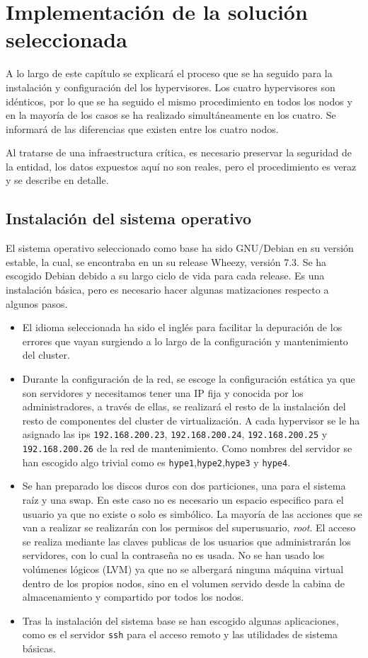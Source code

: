 \documentclass[12pt,a4paper,titlepage,twoside]{report}
\begin{document}
\chapter{Implementación de la solución seleccionada}

\par A lo largo de este capítulo se explicará el proceso que se ha seguido para la instalación y configuración del los hypervisores. Los cuatro hypervisores son idénticos, por lo que se ha seguido el mismo procedimiento en todos los nodos y en la mayoría de los casos se ha realizado simultáneamente en los cuatro. Se informará de las diferencias que existen entre los cuatro nodos.
\par Al tratarse de una infraestructura crítica, es necesario preservar la seguridad de la entidad, los datos expuestos aquí no son reales, pero el procedimiento es veraz y se describe en detalle.
\section{Instalación del sistema operativo}
El sistema operativo seleccionado como base ha sido GNU/Debian en su versión estable, la cual, se encontraba en un su release Wheezy, versión 7.3. Se ha escogido Debian debido a su largo ciclo de vida para cada release. Es una instalación básica, pero es necesario hacer algunas matizaciones respecto a algunos pasos.
\begin{itemize}
	\item El idioma seleccionada ha sido el inglés para facilitar la depuración de los errores que vayan surgiendo a lo largo de la configuración y mantenimiento del cluster.
	\item Durante la configuración de la red, se escoge la configuración estática ya que son servidores y necesitamos tener una IP fija y conocida por los administradores, a través de ellas, se realizará el resto de la instalación del resto de componentes del cluster de virtualización. A cada hypervisor se le ha asignado las ips \verb|192.168.200.23|, \verb|192.168.200.24|, \verb|192.168.200.25| y \verb|192.168.200.26| de la red de mantenimiento. Como nombres del servidor se han escogido algo trivial como es \verb|hype1|,\verb|hype2|,\verb|hype3| y \verb|hype4|.
	\item Se han preparado los discos duros con dos particiones, una para el sistema raíz y una swap. En este caso no es necesario un espacio especifico para el usuario ya que no existe o solo es simbólico. La mayoría de las acciones que se van a realizar se realizarán con los permisos del superusuario, \textit{root}. El acceso se realiza mediante las claves publicas de los usuarios que administrarán los servidores, con lo cual la contraseña no es usada. No se han usado los volúmenes lógicos (LVM) ya que no se albergará ninguna máquina virtual dentro de los propios nodos, sino en el volumen servido desde la cabina de almacenamiento y  compartido por todos los nodos.
	\item Tras la instalación del sistema base se han escogido algunas aplicaciones, como es el servidor \verb|ssh| para el acceso remoto y las utilidades de sistema básicas.
\end{itemize}
\end{document}
